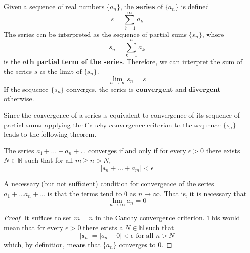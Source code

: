\documentclass{article}
\begin{document}
    \begin{definition}
      Given a sequence of real numbers $\{a_n\}$, the \textbf{series} of $\{a_n\}$ is defined
      \begin{equation}
        s = \sum_{k=1}^\infty a_k
      \end{equation}
      The series can be interpreted as the sequence of partial sums $\{s_n\}$, where
      \begin{equation}
        s_n = \sum_{k=1}^n a_k
      \end{equation}
      is the \textbf{$n$th partial term of the series}. Therefore, we can interpret the sum of the series $s$ as the limit of $\{s_n\}$. 
      \begin{equation}
        \lim_{n \rightarrow \infty} s_n = s
      \end{equation}
      If the sequence $\{s_n\}$ converges, the series is \textbf{convergent} and \textbf{divergent} otherwise. 
    \end{definition}

    Since the convergence of a series is equivalent to convergence of its sequence of partial sums, applying the Cauchy convergence criterion to the sequence $\{s_n\}$ leads to the following theorem. 

    \begin{theorem}
      The series $a_1 + \ldots + a_n + \ldots$ converges if and only if for every $\epsilon > 0$ there exists $N \in \mathbb{N}$ such that for all $m \geq n > N$, 
      \begin{equation}
        |a_n + \ldots + a_m| < \epsilon
      \end{equation}
    \end{theorem}

    \begin{definition}

    \end{definition}

    \begin{corollary}
      A necessary (but not sufficient) condition for convergence of the series $a_1 + \ldots a_n + \ldots$ is that the terms tend to $0$ as $n \rightarrow \infty$. That is, it is necessary that
      \begin{equation}
        \lim_{n\rightarrow \infty} a_n = 0
      \end{equation}
    \end{corollary}
    \begin{proof}
      It suffices to set $m = n$ in the Cauchy convergence criterion. This would mean that for every $\epsilon > 0$ there exists a $N \in \mathbb{N}$ such that 
      \begin{equation}
        |a_n| = |a_n - 0| < \epsilon \text{ for all } n > N
      \end{equation}
      which, by definition, means that $\{a_n\}$ converges to $0$. 
    \end{proof}
\end{document}
